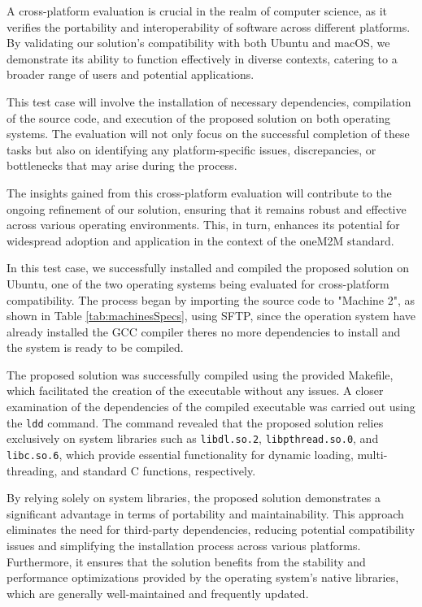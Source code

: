 \documentclass[a4paper,fleqn]{cas-dc}
\begin{document}
A cross-platform evaluation is crucial in the realm of computer science, as it verifies the portability and interoperability of software across different platforms. By validating our solution's compatibility with both Ubuntu and macOS, we demonstrate its ability to function effectively in diverse contexts, catering to a broader range of users and potential applications.

This test case will involve the installation of necessary dependencies, compilation of the source code, and execution of the proposed solution on both operating systems. The evaluation will not only focus on the successful completion of these tasks but also on identifying any platform-specific issues, discrepancies, or bottlenecks that may arise during the process.

The insights gained from this cross-platform evaluation will contribute to the ongoing refinement of our solution, ensuring that it remains robust and effective across various operating environments. This, in turn, enhances its potential for widespread adoption and application in the context of the oneM2M standard.

In this test case, we successfully installed and compiled the proposed solution on Ubuntu, one of the two operating systems being evaluated for cross-platform compatibility. The process began by importing the source code to "Machine 2", as shown in Table \ref{tab:machinesSpecs}, using SFTP, since the operation system have already installed the GCC compiler theres no more dependencies to install and the system is ready to be compiled.

The proposed solution was successfully compiled using the provided Makefile, which facilitated the creation of the executable without any issues. A closer examination of the dependencies of the compiled executable was carried out using the \texttt{ldd} command. The command revealed that the proposed solution relies exclusively on system libraries such as \texttt{libdl.so.2}, \texttt{libpthread.so.0}, and \texttt{libc.so.6}, which provide essential functionality for dynamic loading, multi-threading, and standard C functions, respectively.

By relying solely on system libraries, the proposed solution demonstrates a significant advantage in terms of portability and maintainability. This approach eliminates the need for third-party dependencies, reducing potential compatibility issues and simplifying the installation process across various platforms. Furthermore, it ensures that the solution benefits from the stability and performance optimizations provided by the operating system's native libraries, which are generally well-maintained and frequently updated.
\end{document}
